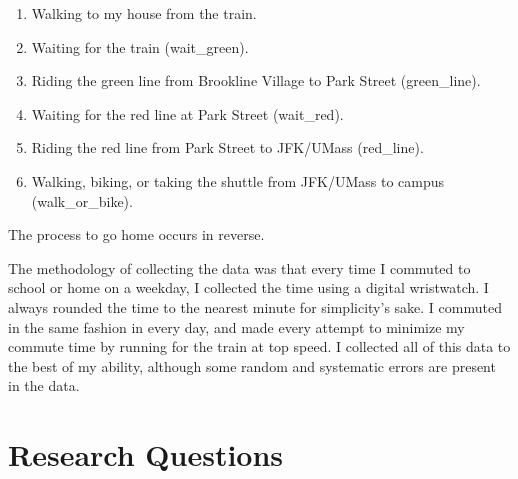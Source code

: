 \documentclass[
]{article}
\providecommand{\tightlist}{%
  \setlength{\itemsep}{0pt}\setlength{\parskip}{0pt}}
\begin{document}
\begin{enumerate}
\def\labelenumi{\arabic{enumi}.}
\tightlist
\item
  Walking to my house from the train.
\item
  Waiting for the train (wait\_green).
\item
  Riding the green line from Brookline Village to Park Street
  (green\_line).
\item
  Waiting for the red line at Park Street (wait\_red).
\item
  Riding the red line from Park Street to JFK/UMass (red\_line).
\item
  Walking, biking, or taking the shuttle from JFK/UMass to campus
  (walk\_or\_bike).
\end{enumerate}

The process to go home occurs in reverse.

The methodology of collecting the data was that every time I commuted to
school or home on a weekday, I collected the time using a digital
wristwatch. I always rounded the time to the nearest minute for
simplicity's sake. I commuted in the same fashion in every day, and made
every attempt to minimize my commute time by running for the train at
top speed. I collected all of this data to the best of my ability,
although some random and systematic errors are present in the data.

\hypertarget{research-questions}{%
\section{Research Questions}\label{research-questions}}
\end{document}
